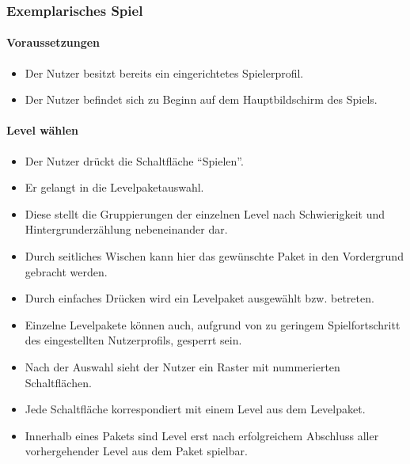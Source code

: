 \subsubsection{Exemplarisches Spiel}
\paragraph{Voraussetzungen}\mbox{}\newline
\begin{itemize}
\item Der Nutzer besitzt bereits ein eingerichtetes Spielerprofil.
\item Der Nutzer befindet sich zu Beginn auf dem Hauptbildschirm des Spiels.
\end{itemize}

\paragraph{Level wählen}\mbox{}\newline
\begin{itemize}
\item Der Nutzer drückt die Schaltfläche ``Spielen''.
\item Er gelangt in die Levelpaketauswahl.
\item Diese stellt die Gruppierungen der einzelnen Level nach Schwierigkeit und 
Hintergrunderzählung nebeneinander dar. 
\item Durch seitliches Wischen kann hier das gewünschte Paket in den Vordergrund gebracht werden.
\item Durch einfaches Drücken wird ein Levelpaket ausgewählt bzw. betreten.
\item Einzelne Levelpakete können auch, aufgrund von zu geringem Spielfortschritt des 
eingestellten Nutzerprofils, gesperrt sein.
\item Nach der Auswahl sieht der Nutzer ein Raster mit nummerierten Schaltflächen.
\item Jede Schaltfläche korrespondiert mit einem Level aus dem Levelpaket.
\item Innerhalb eines Pakets sind Level erst nach erfolgreichem Abschluss aller vorhergehender Level aus dem Paket spielbar.
\end{itemize}

